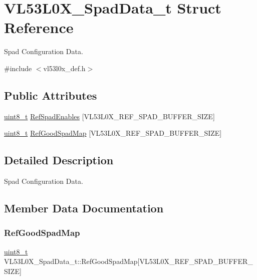 \hypertarget{structVL53L0X__SpadData__t}{}\section{V\+L53\+L0\+X\+\_\+\+Spad\+Data\+\_\+t Struct Reference}
\label{structVL53L0X__SpadData__t}


Spad Configuration Data.  




{\ttfamily \#include $<$vl53l0x\+\_\+def.\+h$>$}

\subsection*{Public Attributes}
\begin{DoxyCompactItemize}
\item 
\hyperlink{vl53l0x__types_8h_aba7bc1797add20fe3efdf37ced1182c5}{uint8\+\_\+t} \hyperlink{structVL53L0X__SpadData__t_a812a69fca8ab84bbc7b36d0e3ca1ac48}{Ref\+Spad\+Enables} \mbox{[}V\+L53\+L0\+X\+\_\+\+R\+E\+F\+\_\+\+S\+P\+A\+D\+\_\+\+B\+U\+F\+F\+E\+R\+\_\+\+S\+I\+ZE\mbox{]}
\item 
\hyperlink{vl53l0x__types_8h_aba7bc1797add20fe3efdf37ced1182c5}{uint8\+\_\+t} \hyperlink{structVL53L0X__SpadData__t_a562092f1b15cc1a6124391a14c8946f9}{Ref\+Good\+Spad\+Map} \mbox{[}V\+L53\+L0\+X\+\_\+\+R\+E\+F\+\_\+\+S\+P\+A\+D\+\_\+\+B\+U\+F\+F\+E\+R\+\_\+\+S\+I\+ZE\mbox{]}
\end{DoxyCompactItemize}


\subsection{Detailed Description}
Spad Configuration Data. 

\subsection{Member Data Documentation}
\mbox{\label{structVL53L0X__SpadData__t_a562092f1b15cc1a6124391a14c8946f9}} 
\subsubsection{\texorpdfstring{Ref\+Good\+Spad\+Map}{RefGoodSpadMap}}
{\footnotesize\ttfamily \hyperlink{vl53l0x__types_8h_aba7bc1797add20fe3efdf37ced1182c5}{uint8\+\_\+t} V\+L53\+L0\+X\+\_\+\+Spad\+Data\+\_\+t\+::\+Ref\+Good\+Spad\+Map\mbox{[}V\+L53\+L0\+X\+\_\+\+R\+E\+F\+\_\+\+S\+P\+A\+D\+\_\+\+B\+U\+F\+F\+E\+R\+\_\+\+S\+I\+ZE\mbox{]}}

